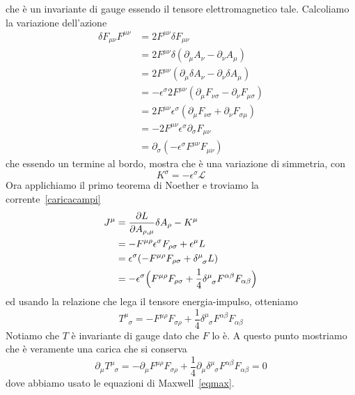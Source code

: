     che è un invariante di gauge essendo il tensore elettromagnetico tale. Calcoliamo la variazione dell'azione
\begin{equation*}
\begin{aligned}
    \delta F_{\mu\nu} F^{\mu\nu} & = 2 F^{\mu\nu} \delta F_{\mu\nu} \\ &= 2 F^{\mu\nu} \delta (\partial_\mu A_\nu - \partial_\nu A_\mu) \\ & = 2 F^{\mu\nu} (\partial_\mu \delta A_\nu - \partial_\nu \delta A_\mu) \\ & = - \epsilon^\sigma 2 F^{\mu\nu} (\partial_\mu F_{\nu\sigma}  - \partial_\nu F_{\mu\sigma}) \\ & = 2 F^{\mu\nu} \epsilon^\sigma (\partial_\mu F_{\nu\sigma} + \partial_\nu F_{\sigma\mu}) \\ & = - 2 F^{\mu\nu} \epsilon^\sigma \partial_\sigma F_{\mu\nu} \\ & = \partial_\sigma (-\epsilon^\sigma F^{\mu\nu} F_{\mu\nu})
\end{aligned}
\end{equation*}
    che essendo un termine al bordo, mostra che è una variazione di simmetria, con 
\begin{equation*}
    K^\sigma = -\epsilon^\sigma \mathcal L
\end{equation*}
    Ora applichiamo il primo teorema di Noether e troviamo la corrente~\eqref{caricacampi} 
\begin{equation*}
\begin{aligned}
    J^\mu & = \pdv{L}{A_{\rho,\mu}} \delta A_\rho - K^\mu \\ & = - F^{\mu\rho} \epsilon^\sigma F_{\rho\sigma} + \epsilon^\mu L \\ & = \epsilon^\sigma (- F^{\mu\rho} F_{\rho \sigma} + \delta^\mu_{\phantom \mu \sigma} L ) \\ & = - \epsilon^\sigma \Big ( F^{\mu\rho} F_{\rho\sigma} + \frac{1}{4} \delta^\mu_{\phantom \mu \sigma} F^{\alpha \beta} F_{\alpha \beta} \Big)
\end{aligned}
\end{equation*}
    ed usando la relazione che lega il tensore energia-impulso, otteniamo 
\begin{equation*}
    T^\mu_{\phantom \mu \sigma} = - F^{\mu\rho} F_{\sigma\rho} + \frac{1}{4} \delta^\mu_{\phantom \mu \sigma} F^{\alpha \beta} F_{\alpha \beta}
\end{equation*}
    Notiamo che $T$ è invariante di gauge dato che $F$ lo è. A questo punto mostriamo che è veramente una carica che si conserva
\begin{equation*}
    \partial_\mu T^\mu_{\phantom \mu \sigma} = - \partial_\mu F^{\mu\rho} F_{\sigma\rho} + \frac{1}{4} \partial_\mu \delta^\mu_{\phantom \mu \sigma} F^{\alpha \beta} F_{\alpha \beta} = 0
\end{equation*} 
    dove abbiamo usato le equazioni di Maxwell~\eqref{eqmax}.


